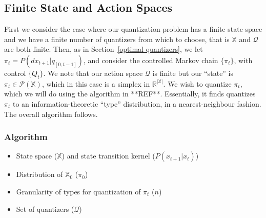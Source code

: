 \documentclass{article}
\begin{document}
\subsection{Finite State and Action Spaces}
First we consider the case where our quantization problem has a finite state space and we have a finite number of quantizers from which to choose, that is \( \mathbb{X} \) and \( \mathcal{Q} \) are both finite. Then, as in Section~\ref{optimal quantizers}, we let \( \pi_t = P(dx_{t+1} | q_{[0,t-1]}) \), and consider the controlled Markov chain \( \{\pi_t\} \), with control \( \{Q_t\} \). We note that our action space \( \mathcal{Q} \) is finite but our ``state'' is \( \pi_t \in \mathcal{P}(\mathbb{X}) \), which in this case is a simplex in \( \mathbb{R}^{|\mathbb{X}|}\). We wish to quantize \( \pi_t \), which we will do using the algorithm in **REF**. Essentially, it finds quantizes \( \pi_t \) to an information-theoretic ``type'' distribution, in a nearest-neighbour fashion. The overall algorithm follows.

\subsubsection{Algorithm}
\begin{itemize}
    \item State space (\( \mathbb{X} \)) and state transition kernel (\( P(x_{t+1} | x_t) \))
    \item Distribution of \( \mathbb{X}_0 \) (\( \pi_0 \))
    \item Granularity of types for quantization of \( \pi_t \) (\( n \))
    \item Set of quantizers (\( \mathcal{Q} \))
\end{itemize}
\end{document}
